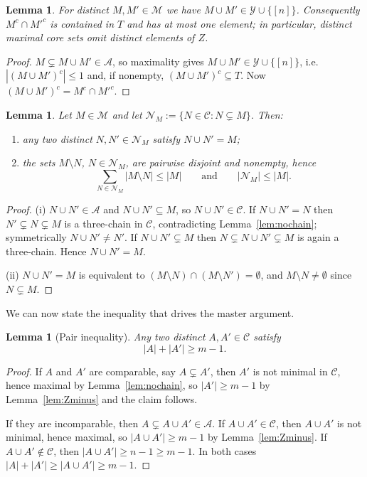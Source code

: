 \documentclass[11pt,a4paper]{amsart}
\theoremstyle{plain}
\newtheorem{lemma}[theorem]{Lemma}
\theoremstyle{definition}
\newcommand{\A}{\mathcal{A}}
\newcommand{\Cc}{\mathcal{C}}
\newcommand{\Mm}{\mathcal{M}}
\newcommand{\Nn}{\mathcal{N}}
\newcommand{\Yy}{\mathcal{Y}}
\begin{document}
\begin{lemma}\label{lem:pairM}
For distinct $M,M'\in\Mm$ we have $M\cup M'\in\Yy\cup\{[n]\}$. Consequently
$M^c\cap M'^c$ is contained in $T$ and has at most one element; in particular,
distinct maximal core sets omit distinct elements of $Z$.
\end{lemma}

\begin{proof}
$M\subsetneq M\cup M'\in\A$, so maximality gives
$M\cup M'\in\Yy\cup\{[n]\}$, i.e.\ $|(M\cup M')^c|\le1$ and, if nonempty,
$(M\cup M')^c\subseteq T$. Now $(M\cup M')^c=M^c\cap M'^c$.
\end{proof}

\begin{lemma}\label{lem:children}
Let $M\in\Mm$ and let $\Nn_M:=\{N\in\Cc:N\subsetneq M\}$. Then:
\begin{enumerate}
\item[(i)] any two distinct $N,N'\in\Nn_M$ satisfy $N\cup N'=M$;
\item[(ii)] the sets $M\setminus N$, $N\in\Nn_M$, are pairwise disjoint and
nonempty, hence
\[
  \sum_{N\in\Nn_M}|M\setminus N|\le|M|
  \qquad\text{and}\qquad
  |\Nn_M|\le|M|.
\]
\end{enumerate}
\end{lemma}

\begin{proof}
(i) $N\cup N'\in\A$ and $N\cup N'\subseteq M$, so $N\cup N'\in\Cc$. If
$N\cup N'=N$ then $N'\subsetneq N\subsetneq M$ is a three-chain in $\Cc$,
contradicting Lemma~\ref{lem:nochain}; symmetrically $N\cup N'\neq N'$. If
$N\cup N'\subsetneq M$ then $N\subsetneq N\cup N'\subsetneq M$ is again a
three-chain. Hence $N\cup N'=M$.

(ii) $N\cup N'=M$ is equivalent to
$(M\setminus N)\cap(M\setminus N')=\emptyset$, and $M\setminus N\neq\emptyset$
since $N\subsetneq M$.
\end{proof}

We can now state the inequality that drives the master argument.

\begin{lemma}[Pair inequality]\label{lem:P}
Any two distinct $A,A'\in\Cc$ satisfy
\[
  |A|+|A'|\ge m-1.
\]
\end{lemma}

\begin{proof}
If $A$ and $A'$ are comparable, say $A\subsetneq A'$, then $A'$ is not minimal
in $\Cc$, hence maximal by Lemma~\ref{lem:nochain}, so $|A'|\ge m-1$ by
Lemma~\ref{lem:Zminus} and the claim follows.

If they are incomparable, then $A\subsetneq A\cup A'\in\A$. If
$A\cup A'\in\Cc$, then $A\cup A'$ is not minimal, hence maximal, so
$|A\cup A'|\ge m-1$ by Lemma~\ref{lem:Zminus}. If $A\cup A'\notin\Cc$, then
$|A\cup A'|\ge n-1\ge m-1$. In both cases
$|A|+|A'|\ge|A\cup A'|\ge m-1$.
\end{proof}
\end{document}
